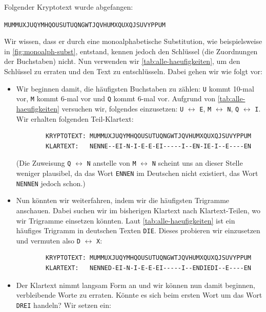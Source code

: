 \begin{myexample}\label{myexample:monoalph-subst-freq}
	Folgender Kryptotext wurde abgefangen:

	\texttt{MUMMUXJUQYMHQOUSUTUQNGWTJQVHUMXQUXQJSUVYPPUM}

	Wir wissen, dass er durch eine monoalphabetische Substitution, wie beispielsweise in \cref{fig:monoalph-subst}, entstand, kennen jedoch den Schlüssel (die Zuordnungen der Buchstaben) nicht.
	Nun verwenden wir \cref{tab:alle-haeufigkeiten}, um den Schlüssel zu erraten und den Text zu entschlüsseln. Dabei gehen wir wie folgt vor:

	\begin{itemize}
		\item Wir beginnen damit, die häufigsten Buchstaben zu zählen: \texttt{U} kommt 10-mal vor, \texttt{M} kommt 6-mal vor und \texttt{Q} kommt 6-mal vor.
		      Aufgrund von \cref{tab:alle-haeufigkeiten} versuchen wir, folgendes einzusetzen: \texttt{U} $\leftrightarrow$ \texttt{E}, \texttt{M} $\leftrightarrow$ \texttt{N}, \texttt{Q} $\leftrightarrow$ \texttt{I}.
		      Wir erhalten folgenden Teil-Klartext:
		      \begin{verbatim}
		KRYPTOTEXT: MUMMUXJUQYMHQOUSUTUQNGWTJQVHUMXQUXQJSUVYPPUM
		KLARTEXT:   NENNE--EI-N-I-E-E-EI-----I--EN-IE-I--E----EN
    \end{verbatim}
		      (Die Zuweisung \texttt{Q} $\leftrightarrow$ \texttt{N} anstelle von \texttt{M} $\leftrightarrow$ \texttt{N} scheint uns an dieser Stelle weniger plausibel, da das Wort \texttt{ENNEN} im Deutschen nicht existiert, das Wort \texttt{NENNEN} jedoch schon.)
		\item Nun könnten wir weiterfahren, indem wir die häufigsten Trigramme anschauen. Dabei suchen wir im bisherigen Klartext nach Klartext-Teilen, wo wir Trigramme einsetzen könnten. Laut \cref{tab:alle-haeufigkeiten} ist ein häufiges Trigramm in deutschen Texten \texttt{DIE}. Dieses probieren wir einzusetzen und vermuten also \texttt{D} $\leftrightarrow$ \texttt{X}:
		      \begin{verbatim}
		KRYPTOTEXT: MUMMUXJUQYMHQOUSUTUQNGWTJQVHUMXQUXQJSUVYPPUM
		KLARTEXT:   NENNED-EI-N-I-E-E-EI-----I--ENDIEDI--E----EN
    \end{verbatim}
		\item Der Klartext nimmt langsam Form an und wir können nun damit beginnen, verbleibende Worte zu erraten. Könnte es sich beim ersten Wort um das Wort \texttt{DREI} handeln? Wir setzen ein:
		      \begin{verbatim}

\end{verbatim}
\end{itemize}
\end{myexample}
